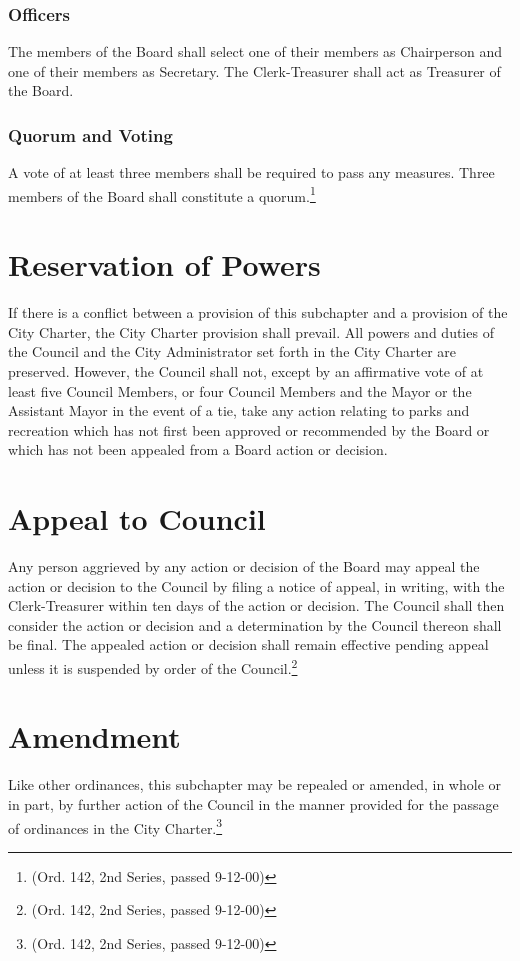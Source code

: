 \subsubsection{Officers}
The members of the Board shall select one of their members as Chairperson and one of their members as Secretary.  The Clerk-Treasurer shall act as Treasurer of the Board.
\subsubsection{Quorum and Voting}
A vote of at least three members shall be required to pass any measures.  Three members of the Board shall constitute a quorum.\footnote{(Ord. 142, 2nd Series, passed 9-12-00)}

\section{Reservation of Powers}
If there is a conflict between a provision of this subchapter and a provision of the City Charter, the City Charter provision shall prevail.  All powers and duties of the Council and the City Administrator set forth in the City Charter are preserved. However, the Council shall not, except by an affirmative vote of at least five Council Members, or four Council Members and the Mayor or the Assistant Mayor in the event of a tie, take any action relating to parks and recreation which has not first been approved or recommended by the Board or which has not been appealed from a Board action or decision.

\section{Appeal to Council}
Any person aggrieved by any action or decision of the Board may appeal the action or decision to the Council by filing a notice of appeal, in writing, with the Clerk-Treasurer within ten days of the action or decision.  The Council shall then consider the action or decision and a determination by the Council thereon shall be final.  The appealed action or decision shall remain effective pending appeal unless it is suspended by order of the Council.\footnote{(Ord. 142, 2nd Series, passed 9-12-00)}

\section{Amendment}
Like other ordinances, this subchapter may be repealed or amended, in whole or in part, by further action of the Council in the manner provided for the passage of ordinances in the City Charter.\footnote{(Ord. 142, 2nd Series, passed 9-12-00)}
